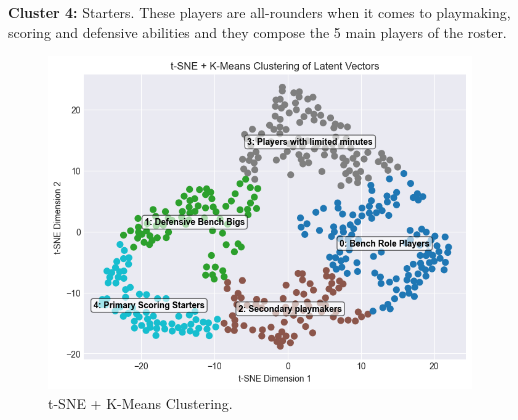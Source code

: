 \documentclass{article}
\begin{document}
{\bf Cluster 4:} Starters. These players are all-rounders when it comes to playmaking, scoring and defensive abilities and they compose the 5 main players of the roster.

\begin{figure}[h]
    \centering
    \includegraphics[width=0.7\linewidth]{media/2c.png}
    \caption{t-SNE + K-Means Clustering.}
\end{figure}
\end{document}
